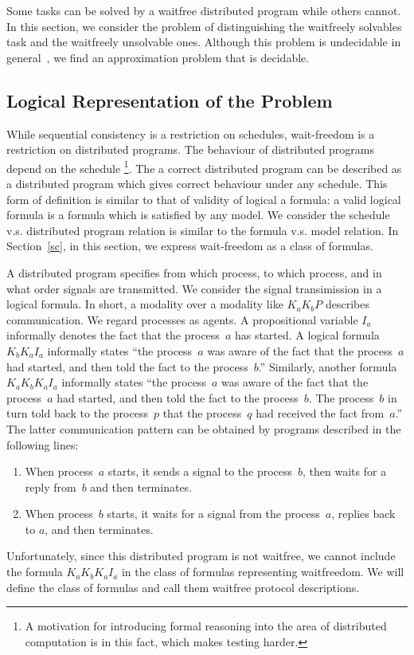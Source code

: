 \documentclass[doctor]{iscs-thesis}
\begin{document}
Some tasks can be solved by a waitfree distributed program while others cannot.
In this section, we consider the problem of
distinguishing the waitfreely solvables task and the waitfreely unsolvable ones.
Although this problem is undecidable in general~\cite{gafni1999three},
we find an approximation problem that is decidable.

\subsection{Logical Representation of the Problem}

While sequential consistency is a restriction on schedules,
wait-freedom is a restriction on distributed programs.
The behaviour of distributed programs depend on the schedule%
\footnote{A motivation for introducing formal reasoning into the area of distributed
computation is in this fact, which makes testing harder.}.
The a correct distributed program can be described as
a distributed program which gives correct behaviour under any schedule.
This form of definition is similar to that of validity of logical a formula:
a valid logical formula is a formula which is satisfied by any model.
We consider the schedule v.s. distributed program relation is similar to
the formula v.s. model relation.
In Section~\ref{sc},
in this section, we express wait-freedom as a class of formulas.

A distributed program specifies
from which process, to which process, and in what order
signals are transmitted.
We consider the signal transimission in a logical formula.
In short, a modality over a modality like $K_a K_b P$ describes communication.
We regard processes as agents.
A propositional variable $I_a$ informally denotes the fact that the process~$a$ has
started.
A logical formula $K_b K_a I_a$ informally states
``the process~$a$ was aware of the fact that the process~$a$ had started,
and then told the fact to the process~$b$.''
Similarly, another formula $K_a K_b K_a I_a$ informally states
``the process~$a$ was aware of the fact that the process~$a$ had started,
and then told the fact to the process~$b$. The process~$b$ in turn told back to the
process~$p$ that the process~$q$ had received the fact from~$a$.''
The latter communication pattern can be obtained by programs described in the following lines:
\begin{enumerate}
 \item When process~$a$ starts, it sends a signal to the process~$b$, then waits for a
       reply from~$b$ and then terminates.
 \item When process~$b$ starts, it waits for a signal from the process~$a$,
       replies back to $a$, and then terminates.
\end{enumerate}
Unfortunately,
since this distributed program is not waitfree,
we cannot include the formula
$K_a K_b K_a I_a$
in the class of formulas representing waitfreedom.
We will define the class of formulas and call them waitfree protocol descriptions.
\end{document}
